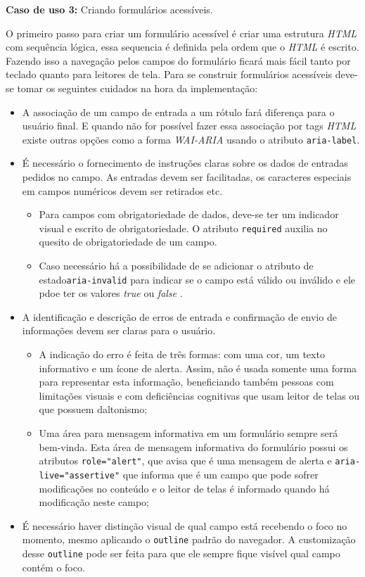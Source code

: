{

{\textbf{Caso de uso 3:} Criando formulários acessíveis.} 

O primeiro passo para criar um formulário acessível é criar uma estrutura \textit{HTML} com sequência lógica, essa sequencia é definida pela ordem que o \textit{HTML} é escrito. Fazendo isso a navegação pelos campos do formulário ficará mais fácil tanto por teclado quanto para leitores de tela. Para se construir formulários acessíveis deve-se tomar os seguintes cuidados na hora da implementação: 
\begin{itemize}
    \item A associação de um campo de entrada a um rótulo fará diferença para o usuário final. E quando não for possível fazer essa associação por tags \textit{HTML} existe outras opções como a forma \textit{WAI-ARIA}  usando o atributo \lstinline{aria-label}.
    \item É necessário o fornecimento de instruções claras sobre os dados de entradas pedidos no campo. As entradas devem ser facilitadas, os caracteres especiais em campos numéricos devem ser retirados etc. 
    \begin{itemize}
        \item Para campos com obrigatoriedade de dados, deve-se ter um indicador visual e escrito de obrigatoriedade. O atributo \lstinline{required} auxilia no quesito de obrigatoriedade de um campo.
        \item Caso necessário há a possibilidade de se adicionar o atributo de estado\lstinline{aria-invalid} para indicar se o campo está válido ou inválido e ele pdoe ter os valores \textit{true} ou \textit{false} .
    \end{itemize}
    \item A identificação e descrição de erros de entrada e confirmação de envio de informações devem ser claras para o usuário. 
    \begin{itemize}
        \item A indicação do erro é feita de três formas: com uma cor, um texto informativo e um ícone de alerta. Assim, não é usada somente uma forma para representar esta informação, beneficiando também pessoas com limitações visuais e com deficiências cognitivas que usam leitor de telas ou que possuem daltonismo;
        \item Uma área para mensagem informativa em um formulário sempre será bem-vinda. Esta área de mensagem informativa do formulário possui os atributos \lstinline{role="alert"}, que avisa que é uma mensagem de alerta e \lstinline{aria-live="assertive"} que informa que é um campo que pode sofrer modificações no conteúdo e o leitor de telas é informado quando há modificação neste campo;
    \end{itemize}
    \item É necessário haver distinção visual de qual campo está recebendo o foco no momento, mesmo aplicando o \lstinline{outline} padrão do navegador. A customização desse \lstinline{outline} pode ser feita para que ele sempre fique visível qual campo contém o foco.
\end{itemize}

}
